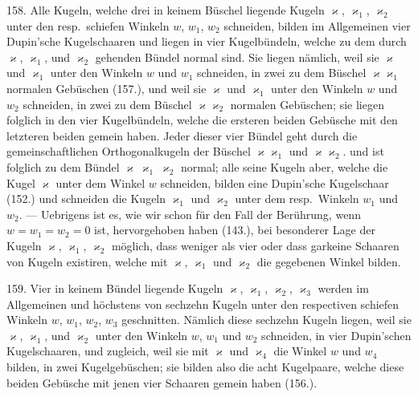 158. Alle Kugeln, welche drei in keinem B\"uschel liegende
Kugeln $\varkappa$, $\varkappa_1$, $\varkappa_2$ unter den resp.\ schiefen Winkeln
$w$, $w_1$, $w_2$ schneiden, bilden im Allgemeinen vier Dupin'sche
Kugelschaaren und liegen in vier Kugelb\"undeln, welche zu
dem durch $\varkappa$, $\varkappa_1$, und $\varkappa_2$ gehenden B\"undel normal sind. Sie
liegen n\"amlich, weil sie $\varkappa$ und $\varkappa_1$ unter den Winkeln $w$
und $w_1$ schneiden, in zwei zu dem B\"uschel $\varkappa\varkappa_1$ normalen Geb\"uschen
(157.), und weil sie $\varkappa$ und $\varkappa_1$ unter den Winkeln $w$
und $w_2$ schneiden, in zwei zu dem B\"uschel $\varkappa\varkappa_2$ normalen
Geb\"uschen; sie liegen folglich in den vier Kugelb\"undeln,
welche die ersteren beiden Geb\"usche mit den letzteren beiden
gemein haben. Jeder dieser vier B\"undel geht durch die gemeinschaftlichen
Orthogonalkugeln der B\"uschel $\varkappa\varkappa_1$ und $\varkappa\varkappa_2$.
und ist folglich zu dem B\"undel $\varkappa\:\varkappa_1\:\varkappa_2$
normal; alle seine
Kugeln aber, welche die Kugel $\varkappa$ unter dem Winkel $w$ schneiden,
bilden eine Dupin'sche Kugelschaar (152.) und schneiden
die Kugeln $\varkappa_1$ und $\varkappa_2$ unter dem resp.\ Winkeln $w_1$ und $w_2$. --- Uebrigens
ist es, wie wir schon f\"ur den Fall der Ber\"uhrung,
wenn $w = w_1 = w_2 = 0$ ist, hervorgehoben haben (143.),
bei besonderer Lage der Kugeln $\varkappa$, $\varkappa_1$, $\varkappa_2$ m\"oglich, dass
weniger als vier oder dass garkeine Schaaren von Kugeln
existiren, welche mit $\varkappa$, $\varkappa_1$ und $\varkappa_2$ die gegebenen Winkel
bilden.

159. Vier in keinem B\"undel liegende Kugeln $\varkappa$, $\varkappa_1$, $\varkappa_2$, $\varkappa_3$
werden im Allgemeinen und h\"ochstens von sechzehn Kugeln
unter den respectiven schiefen Winkeln $w$, $w_1$, $w_2$, $w_3$ geschnitten.
N\"amlich diese sechzehn Kugeln liegen, weil sie
$\varkappa$, $\varkappa_1$, und $\varkappa_2$ unter den Winkeln $w$, $w_1$ und $w_2$ schneiden,
in vier Dupin'schen Kugelschaaren, und zugleich, weil sie
mit $\varkappa$ und $\varkappa_4$ die Winkel $w$ und $w_4$ bilden, in zwei Kugelgeb\"uschen;
sie bilden also die acht Kugelpaare, welche diese
beiden Geb\"usche mit jenen vier Schaaren gemein haben (156.).

\begin{center}
\makebox[15em]{\hrulefill}
\end{center}


\label{p18}


